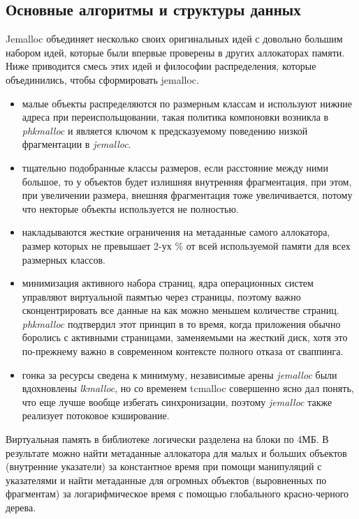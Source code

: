 \subsection{Основные алгоритмы и структуры данных}
Jemalloc объединяет несколько своих оригинальных идей с довольно большим набором идей, которые были впервые проверены в других аллокаторах памяти. Ниже приводится смесь этих идей и философии распределения, которые объединились, чтобы сформировать jemalloc.
\begin{itemize}
	\item малые объекты распределяются по размерным классам и используют нижние адреса при переиспольщовании, такая политика компоновки возникла в \textit{phkmalloc} и является ключом к предсказуемому поведению низкой фрагментации в \textit{jemalloc}.
	\item тщательно подобранные классы размеров, если расстояние между ними большое, то у объектов будет излишняя внутренняя фрагментация, при этом, при увеличении размера, внешняя фрагментация тоже увеличивается, потому что некторые объекты используется не полностью.
	\item накладываются жесткие ограничения на метаданные самого аллокатора, размер которых не превышает 2-ух \% от всей используемой памяти для всех размерных классов.
	\item минимизация активного набора страниц, ядра операционных систем управляют виртуальной паямтью через страницы, поэтому важно сконцентрировать все данные на как можно меньшем количестве страниц. \textit{phkmalloc} подтвердил этот принцип в то время, когда приложения обычно боролись с активными страницами, заменяемыми на жесткий диск, хотя это по-прежнему важно в современном контексте полного отказа от сваппинга.
	\item гонка за ресурсы сведена к минимуму, независимые арены \textit{jemalloc} были вдохновлены \textit{lkmalloc}, но со временем tcmalloc совершенно ясно дал понять, что еще лучше вообще избегать синхронизации, поэтому \textit{jemalloc} также реализует потоковое кэширование.
\end{itemize}

Виртуальная память в библиотеке логически разделена на блоки по 4МБ. В результате можно найти метаданные аллокатора для малых и больших объектов (внутренние указатели) за константное время при помощи манипуляций с указателями и найти метаданные для огромных объектов (выровненных по фрагментам) за логарифмическое время с помощью глобального красно-черного дерева.

